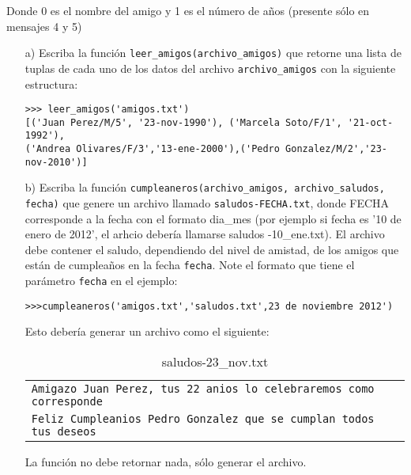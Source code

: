 Donde {0} es el nombre del amigo y {1} es el número de años (presente sólo en mensajes 4 y 5)

\begin{itemize}
    \item[a)] Escriba la función \texttt{leer\_amigos(archivo\_amigos)} que retorne una lista de tuplas de cada uno de los datos del archivo \texttt{archivo\_amigos} con la siguiente estructura:

\begin{lstlisting}[style=consola]
>>> leer_amigos('amigos.txt')
[('Juan Perez/M/5', '23-nov-1990'), ('Marcela Soto/F/1', '21-oct-1992'), 
('Andrea Olivares/F/3','13-ene-2000'),('Pedro Gonzalez/M/2','23-nov-2010')]
\end{lstlisting}

    \item[b)] Escriba la función \texttt{cumpleaneros(archivo\_amigos, archivo\_saludos, fecha)} que genere un archivo llamado \texttt{saludos-FECHA.txt}, donde FECHA corresponde a la fecha con el formato dia\_mes (por ejemplo si fecha es '10 de enero de 2012', el arhcio debería llamarse saludos -10\_ene.txt). El archivo debe contener el saludo, dependiendo del nivel de amistad, de los amigos que están de cumpleaños en la fecha \texttt{fecha}. Note el formato que tiene el parámetro \texttt{fecha} en el ejemplo:
    
    \begin{lstlisting}[style=consola]
>>>cumpleaneros('amigos.txt','saludos.txt',23 de noviembre 2012')
    \end{lstlisting}
    Esto debería generar un archivo como el siguiente:
    
\begin{table}[h]
\centering
\caption{saludos-23\_nov.txt}
\begin{tabular}{|l|}
\hline
\texttt{Amigazo Juan Perez, tus 22 anios lo celebraremos como corresponde} \\
\texttt{Feliz Cumpleanios Pedro Gonzalez que se cumplan todos tus deseos} \\ \hline
\end{tabular}
\end{table}
La función no debe retornar nada, sólo generar el archivo.
\end{itemize}